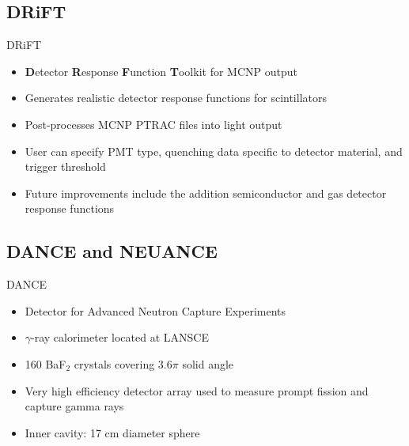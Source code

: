 \documentclass{beamer}
\begin{document}
\subsection{DRiFT}
\begin{frame}{DRiFT}
\begin{itemize}
\item \textbf{D}etector \textbf{R}esponse \textbf{F}unction \textbf{T}oolkit for MCNP output
\item Generates realistic detector response functions for scintillators
\item Post-processes MCNP PTRAC files into light output
\item User can specify PMT type, quenching data specific to detector material, and trigger threshold
\item Future improvements include the addition semiconductor and gas detector response functions
\end{itemize}
\end{frame}

\subsection{DANCE and NEUANCE}
\begin{frame}{DANCE}
\vskip-1.5cm
\begin{itemize}
\item Detector for Advanced Neutron Capture Experiments
\item $\gamma$-ray calorimeter located at LANSCE
\item 160 BaF$_2$ crystals covering 3.6$\pi$ solid angle
\item Very high efficiency detector array used to measure prompt fission and capture gamma rays 
\item Inner cavity: 17 cm diameter sphere
\end{itemize}
\end{frame}
\end{document}
